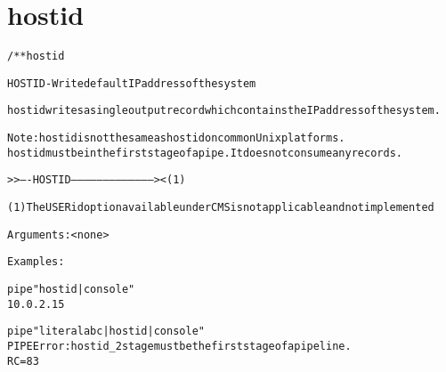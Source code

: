 \section{hostid}
\begin{shaded}
\begin{alltt}
/** hostid


     HOSTID - Write default IP address of the system
   
     hostid writes a single output record which contains the IP address of the system. 
     
     Note:  hostid is not the same as hostid on common Unix platforms.
            hostid must be in the first stage of a pipe.  It does not consume any records.     
       
                                              
     >>----HOSTID ---------------------------------------><   (1)
   
   
     (1) The USERid option available under CMS is not applicable and not implemented
   
     Arguments:  <none>
   
     Examples:
  
     pipe "hostid | console"
     10.0.2.15
   
     pipe "literal abc | hostid | console"
     PIPE Error: hostid_2 stage must be the first stage of a pipeline.
     RC=83
    

\end{alltt}
\end{shaded}
